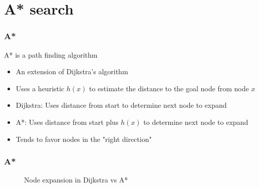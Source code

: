 \section{A* search}

\begin{frame}
\frametitle{A*}
A* is a path finding algorithm
\begin{itemize}
\item An extension of Dijkstra's algorithm
\item Uses a heuristic $h(x)$ to estimate the distance to the goal node from node $x$
\item Dijkstra: Uses distance from start to determine next node to expand
\item A*: Uses distance from start plus $h(x)$ to determine next node to expand
\item Tends to favor nodes in the "right direction"
\end{itemize}
\end{frame}



\begin{frame}
\frametitle{A*}
\begin{figure}[ht]
\caption{Node expansion in Dijkstra vs A*}
\label{fig:}
\end{figure}
\end{frame}

